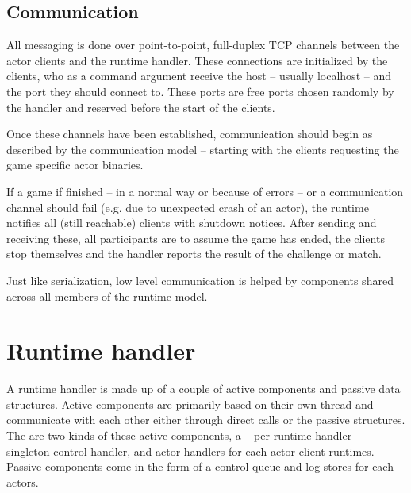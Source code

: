 \documentclass[11pt,a4paper,oneside]{report}
\begin{document}
		\subsection{Communication}
		
		All messaging is done over point-to-point, full-duplex TCP channels between the actor clients and the runtime handler. These connections are initialized by the clients, who as a command argument receive the host -- usually localhost -- and the port they should connect to. These ports are free ports chosen randomly by the handler and reserved before the start of the clients.
		
		Once these channels have been established, communication should begin as described by the communication model -- starting with the clients requesting the game specific actor binaries.
		
		If a game if finished -- in a normal way or because of errors -- or a communication channel should fail (e.g. due to unexpected crash of an actor), the runtime notifies all (still reachable) clients with shutdown notices. After sending and receiving these, all participants are to assume the game has ended, the clients stop themselves and the handler reports the result of the challenge or match.

		Just like serialization, low level communication is helped by components shared across all members of the runtime model.

	\section{Runtime handler}

	A runtime handler is made up of a couple of active components and passive data structures. Active components are primarily based on their own thread and communicate with each other either through direct calls or the passive structures.
	The are two kinds of these active components, a -- per runtime handler -- singleton control handler, and actor handlers for each actor client runtimes. Passive components come in the form of a control queue and log stores for each actors.
		
\end{document}
